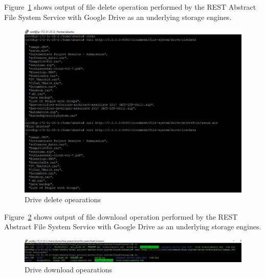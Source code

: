 Figure~\ref{fig:drive-delete} shows output of file delete operation
performed by the REST Abstract File System Service with Google Drive
as an underlying storage engines.

\begin{figure}[!ht]
        \centering\includegraphics[width=\columnwidth]
        {image/drive-delete.JPG}
        \caption{Drive delete opearations}\label{fig:drive-delete}
\end{figure}


Figure~\ref{fig:drive-download} shows output of file download
operation performed by the REST Abstract File System Service with
Google Drive as an underlying storage engines.

\begin{figure}[!ht]
        \centering\includegraphics[width=\columnwidth]
        {image/drive-download.JPG}
        \caption{Drive download opearations}\label{fig:drive-download}
\end{figure}


